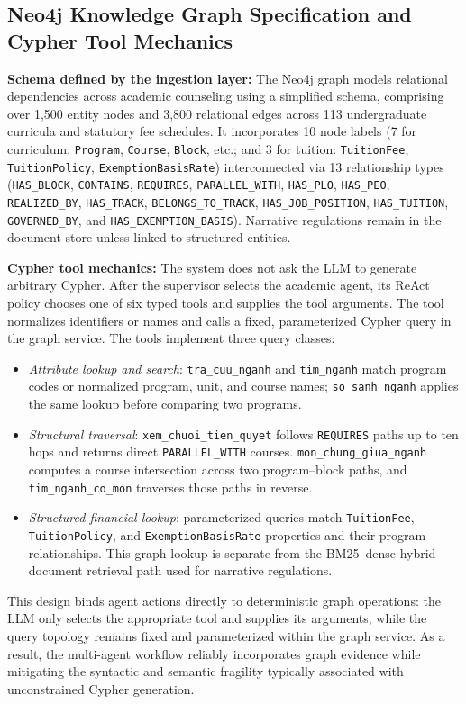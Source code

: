 \subsection{Neo4j Knowledge Graph Specification and Cypher Tool Mechanics}
\label{sec:neo4j_graph}

\textbf{Schema defined by the ingestion layer:}
The Neo4j graph models relational dependencies across academic counseling using a simplified schema, comprising over 1,500 entity nodes and 3,800 relational edges across 113 undergraduate curricula and statutory fee schedules. It incorporates 10 node labels (7 for curriculum: \texttt{Program}, \texttt{Course}, \texttt{Block}, etc.; and 3 for tuition: \texttt{TuitionFee}, \texttt{TuitionPolicy}, \texttt{ExemptionBasisRate}) interconnected via 13 relationship types (\texttt{HAS\_BLOCK}, \texttt{CONTAINS}, \texttt{REQUIRES}, \texttt{PARALLEL\_WITH}, \texttt{HAS\_PLO}, \texttt{HAS\_PEO}, \texttt{REALIZED\_BY}, \texttt{HAS\_TRACK}, \texttt{BELONGS\_TO\_TRACK}, \texttt{HAS\_JOB\_POSITION}, \texttt{HAS\_TUITION}, \texttt{GOVERNED\_BY}, and \texttt{HAS\_EXEMPTION\_BASIS}). Narrative regulations remain in the document store unless linked to structured entities.

\textbf{Cypher tool mechanics:}
The system does not ask the LLM to generate arbitrary Cypher. After the supervisor selects the academic agent, its ReAct policy chooses one of six typed tools and supplies the tool arguments. The tool normalizes identifiers or names and calls a fixed, parameterized Cypher query in the graph service. The tools implement three query classes:
\begin{itemize}
    \setlength{\itemsep}{1.5pt}
    \setlength{\parsep}{0pt}
    \setlength{\parskip}{0pt}
    \item \emph{Attribute lookup and search}: \texttt{tra\_cuu\_nganh} and \texttt{tim\_nganh} match program codes or normalized program, unit, and course names; \texttt{so\_sanh\_nganh} applies the same lookup before comparing two programs.
    \item \emph{Structural traversal}: \texttt{xem\_chuoi\_tien\_quyet} follows \texttt{REQUIRES} paths up to ten hops and returns direct \texttt{PARALLEL\_WITH} courses. \texttt{mon\_chung\_giua\_nganh} computes a course intersection across two program--block paths, and \texttt{tim\_nganh\_co\_mon} traverses those paths in reverse.
    \item \emph{Structured financial lookup}: parameterized queries match \texttt{TuitionFee}, \texttt{TuitionPolicy}, and \texttt{ExemptionBasisRate} properties and their program relationships. This graph lookup is separate from the BM25--dense hybrid document retrieval path used for narrative regulations.
\end{itemize}
This design binds agent actions directly to deterministic graph operations: the LLM only selects the appropriate tool and supplies its arguments, while the query topology remains fixed and parameterized within the graph service. As a result, the multi-agent workflow reliably incorporates graph evidence while mitigating the syntactic and semantic fragility typically associated with unconstrained Cypher generation.

